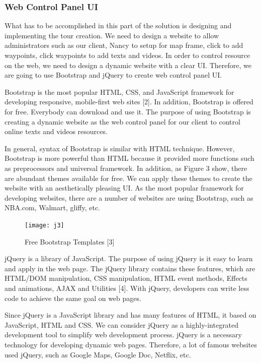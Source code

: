 \documentclass[letterpaper, 10pt,titlepage]{article}
\begin{document}
\subsubsection{Web Control Panel UI}
What has to be accomplished in this part of the solution is designing and implementing the tour creation. We need to design a website to allow administrators such as our client, Nancy to setup for map frame, click to add waypoints, click waypoints to add texts and videos. In order to control resource on the web, we need to design a dynamic website with a clear UI. Therefore, we are going to use Bootstrap and jQuery to create web control panel UI. 


Bootstrap is the most popular HTML, CSS, and JavaScript framework for developing responsive, mobile-first web sites [2]. In addition, Bootstrap is offered for free. Everybody can download and use it. The purpose of using Bootstrap is creating a dynamic website as the web control panel for our client to control online texts and videos resources. 


In general, syntax of Bootstrap is similar with HTML technique. However, Bootstrap is more powerful than HTML because it provided more functions such as preprocessors and universal framework. In addition, as Figure 3 show, there are abundant themes available for free. We can apply these themes to create the website with an aesthetically pleasing UI. As the most popular framework for developing websites, there are a number of websites are using Bootstrap, such as NBA.com, Walmart, gliffy, etc.

\begin{figure}[ht]
    \centering
    \texttt{[image: j3]}
    \caption{Free Bootstrap Templates [3]}
    \label{jiawei3}
\end{figure}

jQuery is a library of JavaScript. The purpose of using jQuery is it easy to learn and apply in the web page. The jQuery library contains these features, which are HTML/DOM manipulation, CSS manipulation, HTML event methods, Effects and animations, AJAX and Utilities [4]. With jQuery, developers can write less code to achieve the same goal on web pages. 


Since jQuery is a JavaScript library and has many features of HTML, it based on JavaScript, HTML and CSS. We can consider jQuery as a highly-integrated development tool to simplify web development process. jQuery is a necessary technology for developing dynamic web pages. Therefore, a lot of famous websites used jQuery, such as Google Maps, Google Doc, Netflix, etc.
\end{document}
